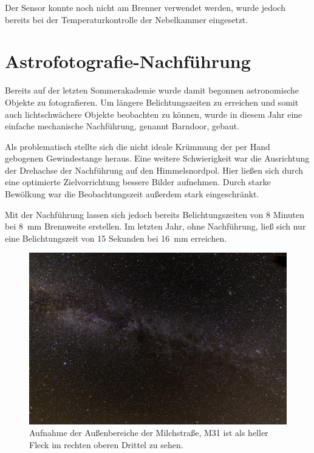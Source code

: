 \documentclass[
  captions=tableheading,  %
  titlepage=false, %
  twocolumn,
  headings=small,
]{scrartcl}
\begin{document}
Der Sensor konnte noch nicht am Brenner verwendet werden, wurde jedoch bereits bei der Temperaturkontrolle der Nebelkammer eingesetzt.

\section*{Astrofotografie-Nachführung}
Bereits auf der letzten Sommerakademie wurde damit begonnen astronomische Objekte zu fotografieren.
Um längere Belichtungszeiten zu erreichen und somit auch lichtschwächere Objekte beobachten zu können, wurde in diesem Jahr eine einfache mechanische Nachführung, genannt Barndoor, gebaut.

Als problematisch stellte sich die nicht ideale Krümmung der per Hand gebogenen Gewindestange heraus.
Eine weitere Schwierigkeit war die Ausrichtung der Drehachse der Nachführung auf den Himmelsnordpol.
Hier ließen sich durch eine optimierte Zielvorrichtung bessere Bilder aufnehmen.
Durch starke Bewölkung war die Beobachtungszeit außerdem stark eingeschränkt.

Mit der Nachführung lassen sich jedoch bereits Belichtungszeiten von 8 Minuten bei \SI{8}{\milli\meter} Brennweite erstellen.
Im letzten Jahr, ohne Nachführung, ließ sich nur eine Belichtungszeit von 15 Sekunden bei \SI{16}{\milli\meter} erreichen.

\begin{figure}
  \centering
  \includegraphics[width=\linewidth]{./images/milkyway.jpg}
  \caption{Aufnahme der Außenbereiche der Milchstraße, M31 ist als heller Fleck im rechten oberen Drittel zu sehen.}
\end{figure}
\end{document}
